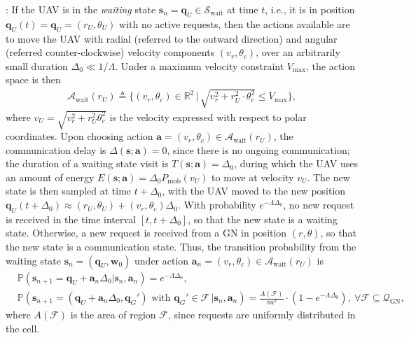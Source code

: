 \documentclass[12pt, draftcls, onecolumn]{IEEEtran}
\theoremstyle{plain}
\theoremstyle{definition}
\theoremstyle{remark}
\begin{document}
: If the UAV is in the \emph{waiting} state $\mathbf{s}_{n} = \mathbf{q}_{U} \in \mathcal{S}_{\mathrm{wait}}$ at time $t$, i.e., it is in position $\mathbf{q}_{U}(t){=}\mathbf{q}_{U}{=}(r_{U},\theta_{U})$ with no active requests, then the actions available are to move the UAV with radial (referred to the outward direction) and angular (referred counter-clockwise) velocity components $(v_{r},\theta_{c})$, over an arbitrarily small duration $\Delta_{0}{\ll}1/\Lambda$. Under a maximum velocity constraint $V_{\mathrm{max}}$, the action space is then 
\begin{align}\label{eq:WaitActions}
	\mathcal{A}_{\mathrm{wait}}(r_U) \triangleq \Big\{(v_{r},\theta_{c}) \in \mathbb R^{2} \, \Big| \, \sqrt{v_{r}^{2} + r_U^2\cdot \theta_{c}^{2}}\leq V_{\mathrm{max}} \Big\},
\end{align}
where $v_{U}=\sqrt{v_{r}^{2}{+}r_{U}^{2}\theta_{c}^{2}}$ is the velocity expressed with respect to polar coordinates. Upon choosing action $\mathbf{a}{=}(v_{r},\theta_{c}){\in}\mathcal{A}_{\mathrm{wait}}(r_{U})$, the communication delay is $\Delta(\mathbf{s};\mathbf{a}){=}0$, since there is no ongoing communication; the duration of a waiting state visit is $T(\mathbf{s};\mathbf{a}){=}\Delta_{0}$, during which the UAV uses an amount of energy $E(\mathbf{s};\mathbf{a}){=}\Delta_{0}P_{\mathrm{mob}} \left(v_{U}\right)$ to move at velocity $v_{U}$. The new state is then sampled at time $t{+}\Delta_{0}$, with the UAV moved to the new position $\mathbf{q}_{U}(t{+}\Delta_{0}){\approx}(r_{U},\theta_{U}){+}(v_{r},\theta_{c})\Delta_{0}$. With probability $e^{-\Lambda \Delta_{0}}$, no new request is received in the time interval $[t,t{+}\Delta_{0}]$, so that the new state is a waiting state.  Otherwise, a new request is received from a GN in position $(r,\theta)$, so that the new state is a communication state. Thus, the transition probability from the waiting state $\mathbf{s}_{n}{=}(\mathbf{q}_{U},\mathbf{w}_{0})$ under action $\mathbf{a}_{n}{=}(v_{r},\theta_{c}){\in}\mathcal{A}_{\mathrm{wait}}(r_{U})$ is 
\begin{align}\label{eq:CommTransProb}
    &\mathbb{P}(\mathbf{s}_{n+1}=\mathbf q_U+\mathbf a_n\Delta_0|\mathbf{s}_n,\mathbf{a}_n) = e^{-\Lambda \Delta_{0}},\\\label{eq:R0ContTrProb}
    &\mathbb{P}(\mathbf{s}_{n+1}=(\mathbf q_U+\mathbf a_n\Delta_0,\mathbf q_G') \text{ with } \mathbf q_G' \in \mathcal{F} \,|\mathbf{s}_n,\mathbf{a}_n) =\frac{A(\mathcal{F})}{\pi a^2} \cdot (1-e^{-\Lambda \Delta_{0}}),\ \forall \mathcal{F}\subseteq \mathcal{Q}_{\mathrm{GN}},
\end{align}
where $A(\mathcal{F})$ is the area of region $\mathcal{F}$, since requests are uniformly distributed in the cell.
\end{document}
